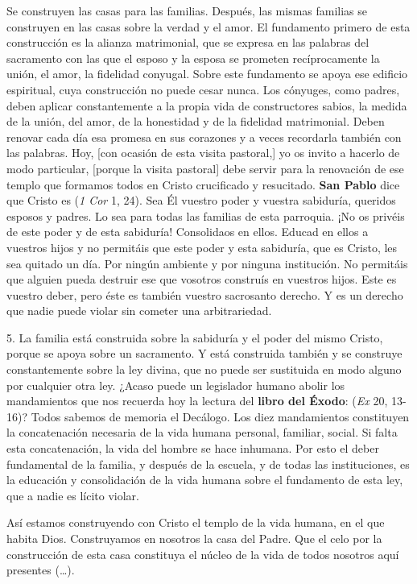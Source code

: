 \begin{body}
Se construyen las casas para las familias. Después, las mismas familias se construyen en las casas sobre la verdad y el amor. El fundamento primero de esta construcción es la alianza matrimonial, que se expresa en las palabras del sacramento con las que el esposo y la esposa se prometen recíprocamente la unión, el amor, la fidelidad conyugal. Sobre este fundamento se apoya ese edificio espiritual, cuya construcción no puede cesar nunca. Los cónyuges, como padres, deben aplicar constantemente a la propia vida de constructores sabios, la medida de la unión, del amor, de la honestidad y de la fidelidad matrimonial. Deben renovar cada día esa promesa en sus corazones y a veces recordarla también con las palabras. Hoy, [con ocasión de esta visita pastoral,] yo os invito a hacerlo de modo particular, [porque la visita pastoral] debe servir para la renovación de ese templo que formamos todos en Cristo crucificado y resucitado. \textbf{San Pablo} dice que Cristo es  (\textit{1 Cor} 1, 24). Sea Él vuestro poder y vuestra sabiduría, queridos esposos y padres. Lo sea para todas las familias de esta parroquia. ¡No os privéis de este poder y de esta sabiduría! Consolidaos en ellos. Educad en ellos a vuestros hijos y no permitáis que este poder y esta sabiduría, que es Cristo, les sea quitado un día. Por ningún ambiente y por ninguna institución. No permitáis que alguien pueda destruir ese  que vosotros construís en vuestros hijos. Este es vuestro deber, pero éste es también vuestro sacrosanto derecho. Y es un derecho que nadie puede violar sin cometer una arbitrariedad.

5. La familia está construida sobre la sabiduría y el poder del mismo Cristo, porque se apoya sobre un sacramento. Y está construida también y se construye constantemente sobre la ley divina, que no puede ser sustituida en modo alguno por cualquier otra ley. ¿Acaso puede un legislador humano abolir los mandamientos que nos recuerda hoy la lectura del \textbf{libro del Éxodo}:  (\textit{Ex} 20, 13-16)? Todos sabemos de memoria el Decálogo. Los diez mandamientos constituyen la concatenación necesaria de la vida humana personal, familiar, social. Si falta esta concatenación, la vida del hombre se hace inhumana. Por esto el deber fundamental de la familia, y después de la escuela, y de todas las instituciones, es la educación y consolidación de la vida humana sobre el fundamento de esta ley, que a nadie es lícito violar.

Así estamos construyendo con Cristo el templo de la vida humana, en el que habita Dios. Construyamos en nosotros la casa del Padre. Que el celo por la construcción de esta casa constituya el núcleo de la vida de todos nosotros aquí presentes (\ldots).
\end{body}

